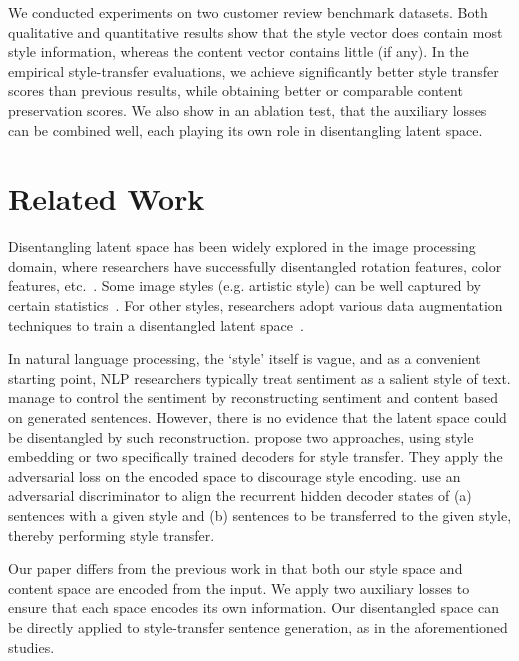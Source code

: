 \documentclass[11pt,a4paper]{article}
\begin{document}
We conducted experiments on two customer review benchmark datasets. Both qualitative and quantitative results show that the style vector does contain most style information, whereas the content vector contains little (if any). In the empirical style-transfer evaluations, we achieve significantly better style transfer scores than previous results, while obtaining better or comparable content preservation scores.  We also show in an ablation test, that the auxiliary losses can be combined well, each playing its own role in disentangling latent space.


\section{Related Work}


Disentangling latent space has been widely explored in the image processing domain, where researchers have successfully disentangled rotation features, color features, etc.~\cite{chen2016infogan,luan2017deep}. Some image styles (e.g. artistic style) can be well captured by certain statistics~\cite{gatys2016image}. For other styles, researchers adopt various data augmentation techniques to train a disentangled latent space~\cite{champandard2016semantic,kulkarni2015deep}.

In natural language processing, the `style' itself is vague, and as a convenient starting point, NLP researchers typically treat sentiment as a salient style of text. \citet{hu2017toward} manage to control the sentiment by reconstructing sentiment and content based on generated sentences. However, there is no evidence that the latent space could be disentangled by such reconstruction. \citet{fu2017style} propose two approaches, using style embedding or two specifically trained decoders for style transfer. They apply the adversarial loss on the encoded space to discourage style encoding. \citet{shen2017style} use an adversarial discriminator to align the recurrent hidden decoder states of (a) sentences with a given style and (b) sentences to be transferred to the given style, thereby performing style transfer.

Our paper differs from the previous work in that both our style space and content space are encoded from the input. We apply two auxiliary losses to ensure that each space encodes its own information. Our disentangled space can be directly applied to style-transfer sentence generation, as in the aforementioned studies.
\end{document}
